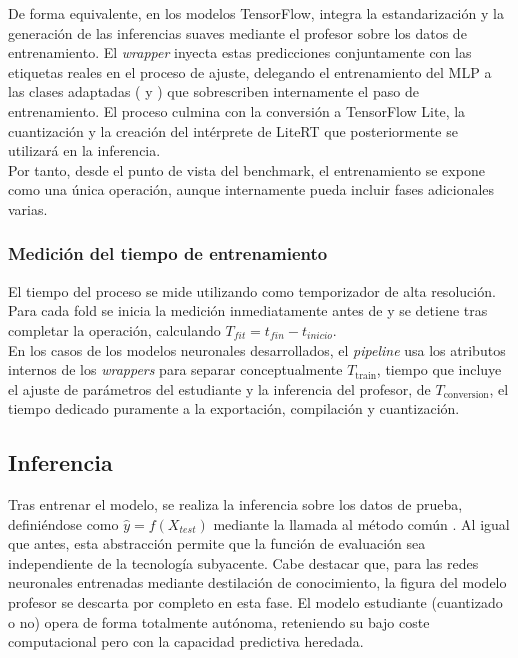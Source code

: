 \documentclass[a4paper,12pt,twoside,final]{book}
\begin{document}
De forma equivalente, en los modelos TensorFlow,  integra la estandarización y la generación de las
inferencias suaves mediante el profesor sobre los datos de entrenamiento. El \textit{wrapper} inyecta estas
predicciones conjuntamente con las etiquetas reales en el proceso de ajuste, delegando el entrenamiento del MLP a las
clases adaptadas ( y ) que sobrescriben internamente el paso de
entrenamiento. El proceso culmina con la conversión a TensorFlow Lite, la cuantización y la creación del intérprete de
LiteRT que posteriormente se utilizará en la inferencia.\\

Por tanto, desde el punto de vista del benchmark, el entrenamiento se expone como una única operación, aunque
internamente pueda incluir fases adicionales varias.

\subsubsection{Medición del tiempo de entrenamiento}
El tiempo del proceso se mide utilizando  como temporizador de alta resolución. Para cada
fold se inicia la medición inmediatamente antes de  y se detiene tras completar la operación, calculando
$T_{fit} = t_{fin} - t_{inicio}$.\\

En los casos de los modelos neuronales desarrollados, el \textit{pipeline} usa los atributos internos de los
\textit{wrappers} para separar conceptualmente $T_{\mathrm{train}}$, tiempo que incluye el ajuste de parámetros del
estudiante y la inferencia del profesor, de $T_{\mathrm{conversion}}$, el tiempo dedicado puramente a la exportación,
compilación y cuantización.

\subsection{Inferencia}
Tras entrenar el modelo, se realiza la inferencia sobre los datos de prueba, definiéndose como $\hat{y} = f(X_{test})$
mediante la llamada al método común . Al igual que antes, esta abstracción permite que la
función de evaluación sea independiente de la tecnología subyacente. Cabe destacar que, para las redes neuronales
entrenadas mediante destilación de conocimiento, la figura del modelo profesor se descarta por completo en esta fase.
El modelo estudiante (cuantizado o no) opera de forma totalmente autónoma, reteniendo su bajo coste computacional pero
con la capacidad predictiva heredada.\\
\end{document}
